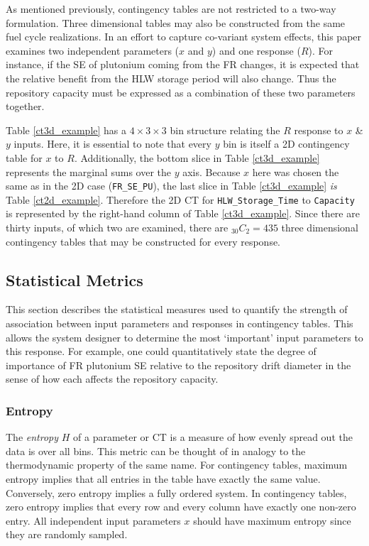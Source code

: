 \documentclass[preprint,12pt]{elsarticle}
\begin{document}
As mentioned previously, contingency tables are not restricted to a two-way formulation.  
Three dimensional tables may also be constructed from the same
fuel cycle realizations.  In an effort to capture co-variant system effects, this paper 
examines two independent parameters ($x$ and $y$) and one response ($R$).  For instance, 
if the SE of plutonium coming from the FR changes, it is expected that the relative benefit 
from the HLW storage period will also change.
Thus the repository capacity must be expressed as a combination of these two parameters together.

%


Table \ref{ct3d_example} has a $4\times 3\times 3$ bin structure relating the $R$ response to $x$ \& $y$ inputs.  Here, it is essential to note that every $y$ bin
is itself a 2D contingency table for $x$ to $R$.
Additionally, the bottom slice in Table \ref{ct3d_example} represents the marginal sums over the $y$ axis.  Because $x$ here was chosen the same as in the
2D case (\texttt{FR\_SE\_PU}), the last slice in Table \ref{ct3d_example} \emph{is} Table \ref{ct2d_example}.  Therefore the 2D CT for \texttt{HLW\_Storage\_Time}
to \texttt{Capacity} is represented by the right-hand column of Table \ref{ct3d_example}.
Since there are thirty inputs, of which two are examined, there are $_{30}C_2 = 435$ three dimensional contingency tables that may be constructed for every response.


\subsection{Statistical Metrics}
\label{sec:statistical_metrics}

This section describes the statistical measures used to quantify the strength of association between input parameters and responses in contingency tables.
This allows the system designer to determine the most `important' input parameters to this response.  For example, one
could quantitatively state the degree of importance of FR plutonium SE relative to the repository drift diameter in the sense of how each affects the repository capacity.

\subsubsection{Entropy}
\label{sec:entropy}

The \emph{entropy} $H$ of a parameter or CT is a measure of how evenly spread out the data is over all bins.  This metric can be thought of
in analogy to the thermodynamic property of the same name.  For contingency tables,
maximum entropy implies that all entries in the table have exactly the same value.
Conversely, zero entropy implies a fully ordered system.  In contingency tables, zero entropy implies that every row and every column have exactly one
non-zero entry.  All independent input parameters $x$ should have maximum entropy since they are randomly sampled.
\end{document}
